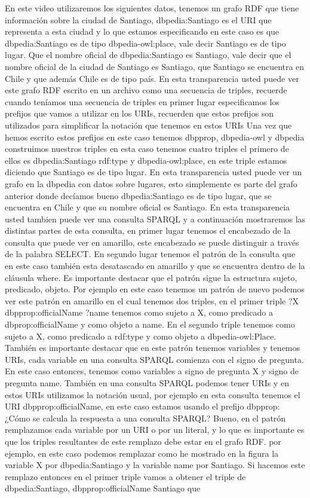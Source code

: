 En este video utilizaremos los siguientes datos, tenemos un grafo RDF que tiene información sobre la ciudad de Santiago, dbpedia:Santiago es el URI que representa a esta ciudad y lo que estamos especificando en este caso es que dbpedia:Santiago es de tipo dbpedia-owl:place, vale decir Santiago es de tipo lugar. Que el nombre oficial de dbpedia:Santiago es Santiago, vale decir que el nombre oficial de la ciudad de Santiago es Santiago, que Santiago se encuentra en Chile y que además Chile es de tipo país. En esta transparencia usted puede ver este grafo RDF escrito en un archivo como una secuencia de triples, recuerde cuando teníamos una secuencia de triples en primer lugar especificamos los prefijos que vamos a utilizar en los URIs, recuerden que estos prefijos son utilizados para simplificar la notación que tenemos en estos URIs Una vez que hemos escrito estos prefijos en este caso tenemos dbpprop, dbpedia-owl y dbpedia construimos nuestros triples en esta caso tenemos cuatro triples el primero de ellos es dbpedia:Santiago rdf:type y dbpedia-owl:place, en este triple estamos diciendo que Santiago es de tipo lugar. En esta transparencia usted puede ver un grafo en la dbpedia con datos sobre lugares, esto simplemente es parte del grafo anterior donde decíamos bueno dbpedia:Santiago es de tipo lugar, que se encuentra en Chile y que su nombre oficial es Santiago. En esta transparencia usted tambien puede ver una consulta SPARQL y a continuación mostraremos las distintas partes de esta consulta, en primer lugar tenemos el encabezado de la consulta que puede ver en amarillo, este encabezado se puede distinguir a través de la palabra SELECT. En segundo lugar tenemos el patrón de la consulta que en este caso también esta desatascado en amarillo y que se encuentra dentro de la cláusula where. Es importante destacar que el patrón sigue la estructura sujeto, predicado, objeto. Por ejemplo en este caso tenemos un patrón de nuevo podemos ver este patrón en amarillo en el cual tenemos dos triples, en el primer triple ?X dbpprop:officialName ?name tenemos como sujeto a X, como predicado a dbprop:officialName y como objeto a name. En el segundo triple tenemos como sujeto a X, como predicado a rdf:type y como objeto a dbpedia-owl:Place. También es importante destacar que en este patrón tenemos variables y tenemos URIs, cada variable en una consulta SPARQL comienza con el signo de pregunta. En este caso entonces, tenemos como variables a signo de pregunta X y signo de pregunta name. También en una consulta SPARQL podemos tener URIs y en estos URIs utilizamos la notación usual, por ejemplo en esta consulta tenemos el URI dbpprop:officialName, en este caso estamos usando el prefijo dbpprop: ¿Cómo se calcula la respuesta a una consulta SPARQL? Bueno, en el patrón remplazamos cada variable por un URI o por un literal, y lo que es importante es que los triples resultantes de este remplazo debe estar en el grafo RDF. por ejemplo, en este caso podemos remplazar como he mostrado en la figura la variable X por dbpedia:Santiago y la variable name por Santiago. Si hacemos este remplazo entonces en el primer triple vamos a obtener el triple de dbpedia:Santiago, dbpprop:officialName Santiago que 